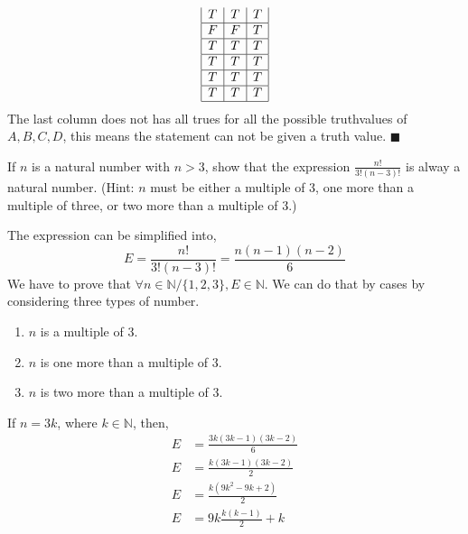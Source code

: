 \documentclass{exam}
\theoremstyle{mytheoremstyle}
\theoremstyle{mytheoremstyle}
\theoremstyle{myproblemstyle}
\begin{document}
\begin{questions}
\begin{parts}
\begin{solution}
\begin{equation*}
\begin{array}{|c|c|c|c|c|c|c|c|c|c|c|}
                    T                               & T                                      & T              \\\hline
                    F                               & F                                      & T              \\\hline
                    T                               & T                                      & T              \\\hline
                    T                               & T                                      & T              \\\hline
                    T                               & T                                      & T              \\\hline
                    T                               & T                                      & T              \\\hline
                \end{array}
            \end{equation*}
            The last column does not has all trues for all the possible truthvalues of \(A,B,C,D\), this means the statement can not be given a truth value. \(\blacksquare\)
        \end{solution}
    \end{parts}

    \question If \(n\) is a natural number with \(n > 3\), show that the expression \(\displaystyle\frac{n!}{3!(n-3)!}\) is alway a natural number. (Hint: \(n\) must be either a multiple of 3, one more than a multiple of three, or two more than a multiple of 3.)
    \begin{solution}
        The expression can be simplified into,
        \[E=\frac{n!}{3!(n-3)!}=\frac{n(n-1)(n-2)}{6}\]
        We have to prove that \(\forall n\in\mathbb{N}/\{1,2,3\},E\in\mathbb{N}\). We can do that by cases by considering three types of number.

        \begin{enumerate}
            \item \(n\) is a multiple of 3.
            \item \(n\) is one more than a multiple of 3.
            \item \(n\) is two more than a multiple of 3.
        \end{enumerate}

        If \(n=3k\), where \(k\in\mathbb{N}\), then,
        \begin{equation}
            \begin{split}
                E&=\frac{3k(3k-1)(3k-2)}{6}\\
                E&=\frac{k(3k-1)(3k-2)}{2}\\
                E&=\frac{k(9k^2-9k+2)}{2}\\
                E&=9k\frac{k(k-1)}{2}+k
            \end{split}
        \end{equation}


\end{solution}
\end{questions}
\end{document}
